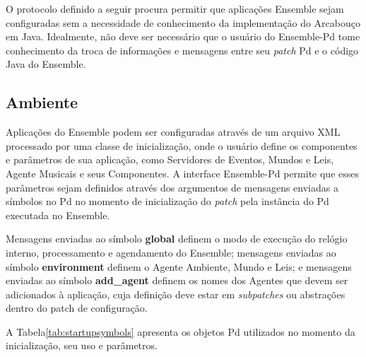 \documentclass[a4paper, 11pt, twoside]{article}
\begin{document}
\begin{multicols}{2}
O protocolo definido a seguir procura permitir que aplicações Ensemble sejam
configuradas sem a necessidade de conhecimento da implementação do Arcabouço
em Java. Idealmente, não deve ser necessário que o usuário do Ensemble-Pd
tome conhecimento da troca de informações e mensagens entre seu \textit{patch}
Pd e o código Java do Ensemble.

\subsection{Ambiente}

Aplicações do Ensemble podem ser configuradas através de um arquivo XML
processado por uma classe de inicialização, onde o usuário define os
componentes e parâmetros de sua aplicação, como Servidores de Eventos,
Mundos e Leis, Agente Musicais e seus Componentes. A interface Ensemble-Pd
permite que esses parâmetros sejam definidos através dos argumentos de 
mensagens enviadas a símbolos no Pd no momento de inicialização do 
\textit{patch} pela instância do Pd executada no Ensemble.

Mensagens enviadas ao símbolo \textbf{global} definem o modo de
execução do relógio interno, processamento e agendamento do Ensemble;
mensagens enviadas ao símbolo \textbf{environment} definem o Agente Ambiente,
Mundo e Leis; e mensagens enviadas ao símbolo \textbf{add\_agent} definem os
nomes dos Agentes que devem ser adicionados à aplicação, cuja definição deve
estar em \textit{subpatches} ou abstrações dentro do patch de configuração.

A Tabela\ref{tab:startupsymbols} apresenta os objetos Pd utilizados no momento
da inicialização, seu uso e parâmetros.

\end{multicols}
\end{document}
